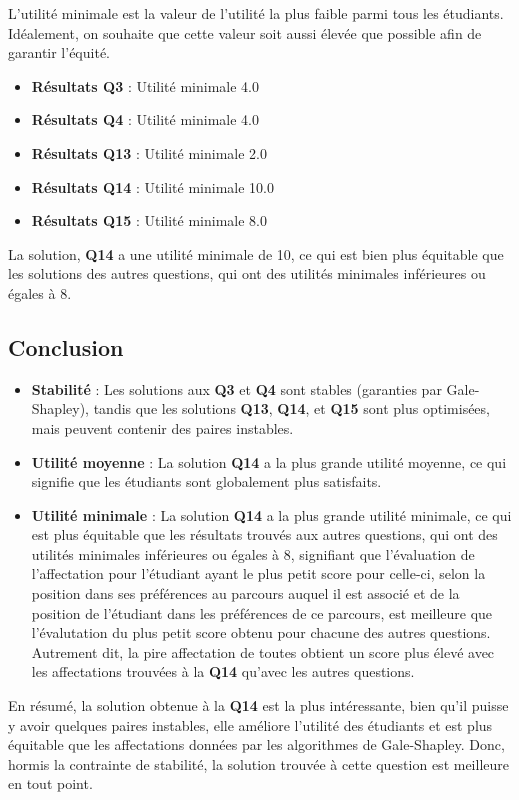 \documentclass[a4paper,11pt]{article}
\begin{document}
L'utilité minimale est la valeur de l'utilité la plus faible parmi tous les étudiants. Idéalement, on souhaite que cette valeur soit aussi élevée que possible afin de garantir l'équité.

\begin{itemize}
    \item \textbf{Résultats Q3} : Utilité minimale 4.0
    \item \textbf{Résultats Q4} : Utilité minimale 4.0
    \item \textbf{Résultats Q13} : Utilité minimale 2.0
    \item \textbf{Résultats Q14} : Utilité minimale 10.0
    \item \textbf{Résultats Q15} : Utilité minimale 8.0
\end{itemize}

La solution, \textbf{Q14} a une utilité minimale de 10, ce qui est bien plus équitable que les solutions des autres questions, qui ont des utilités minimales inférieures ou égales à 8.


\subsection*{Conclusion}

\begin{itemize}
    \item \textbf{Stabilité} : Les solutions aux \textbf{Q3} et \textbf{Q4} sont stables (garanties par Gale-Shapley), tandis que les solutions \textbf{Q13}, \textbf{Q14}, et \textbf{Q15} sont plus optimisées, mais peuvent contenir des paires instables.
    \item \textbf{Utilité moyenne} : La solution \textbf{Q14} a la plus grande utilité moyenne, ce qui signifie que les étudiants sont globalement plus satisfaits.
    \item \textbf{Utilité minimale} : La solution \textbf{Q14} a la plus grande utilité minimale, ce qui est plus équitable que les résultats trouvés aux autres questions, qui ont des utilités minimales inférieures ou égales à 8, signifiant que l'évaluation de l'affectation pour l'étudiant ayant le plus petit score pour celle-ci, selon la position dans ses préférences au parcours auquel il est associé et de la position de l'étudiant dans les préférences de ce parcours, est meilleure que l'évalutation du plus petit score obtenu pour chacune des autres questions. Autrement dit, la pire affectation de toutes obtient un score plus élevé avec les affectations trouvées à la \textbf{Q14} qu'avec les autres questions.
\end{itemize}

En résumé, la solution obtenue à la \textbf{Q14} est la plus intéressante, bien qu'il puisse y avoir quelques paires instables, elle améliore l'utilité des étudiants et est plus équitable que les affectations données par les algorithmes de Gale-Shapley. Donc, hormis la contrainte de stabilité, la solution trouvée à cette question est meilleure en tout point.
\end{document}
